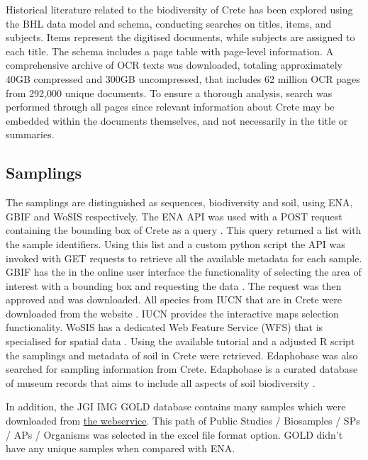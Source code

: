 Historical literature related to the biodiversity of Crete has been explored
using the BHL data model and schema, conducting searches on titles, items, and subjects.
Items represent the digitised documents, while subjects are assigned to each title.
The schema includes a page table with page-level information.
A comprehensive archive of OCR texts was downloaded, totaling approximately
40GB compressed and 300GB uncompressed, that includes 62 million OCR pages from 292,000 unique documents.
To ensure a thorough analysis, search was performed through all pages since
relevant information about Crete may be embedded within the documents
themselves, and not necessarily in the title or summaries.

\subsection{Samplings}\label{crete_samplings}

The samplings are distinguished as sequences, biodiversity and soil, using ENA, GBIF and WoSIS respectively.
The ENA API was used with a POST request containing the bounding box of Crete as a query \parencite{Yuan2023}. This 
query returned a list with the sample identifiers. Using this list and a custom python script the API
was invoked with GET requests to retrieve all the available metadata for each sample.
GBIF has the in the online user interface the functionality of selecting the area of interest with a bounding box and requesting
the data \parencite{noauthor_gbif_nodate}. The request was then approved and was downloaded. All species 
from IUCN that are in Crete were downloaded from the website \parencite{iucn2024}. IUCN provides the 
interactive maps selection functionality. 
WoSIS has a dedicated Web Feature Service (WFS) that is specialised for spatial data \parencite{Batjes2024}. 
Using the available tutorial and a adjusted R script the samplings and metadata of 
soil in Crete were retrieved.
Edaphobase was also searched for sampling information from Crete. Edaphobase is
a curated database of museum records that aims to include all aspects of soil biodiversity \parencite{BURKHARDT20143}.

In addition, the JGI IMG GOLD database contains many samples which were downloaded from \href{https://gold.jgi.doe.gov/downloads}{the webservice}.
This path of Public Studies / Biosamples / SPs / APs / Organisms was selected in the excel file format option. 
GOLD didn't have any unique samples when compared with ENA.

